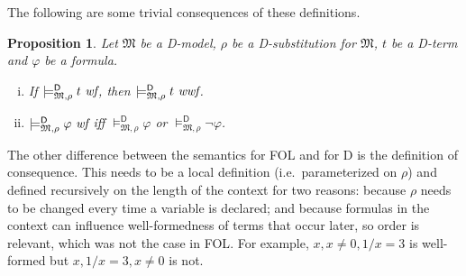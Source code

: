 \documentclass{article}
\newtheorem{proposition}[definition]{Proposition}
\newcommand{\D}{\textsf D}
\newcommand{\FOL}{\textsf{FOL}}
\newcommand{\wf}{\ \mbox{\em wf}}
\newcommand{\wwf}{\ \mbox{\em wwf}}
\newcommand{\mymodelss}[3]{\ensuremath{\models_{\mathfrak{#2},{#3}}^{\mathsf{#1}}}}
\begin{document}
The following are some trivial consequences of these definitions.
\begin{proposition}\label{modelDprops}
Let $\mathfrak M$ be a {\D}-model, $\rho$ be a {\D}-substitution for
$\mathfrak M$, $t$ be a {\D}-term and $\varphi$ be a formula.
\begin{enumerate}[(i)]
\item If $\mymodelss{D}M\rho t\wf$, then $\mymodelss{D}M\rho t\wwf$.
\item $\mymodelss{D}M\rho\varphi\wf$ iff $\mymodelss{D}M\rho\varphi$ or
$\mymodelss{D}M\rho\neg\varphi$.
\end{enumerate}
\end{proposition}

The other difference between the semantics for {\FOL} and for {\D} is
the definition of consequence.  This needs to be a local definition
(i.e.\ parameterized on $\rho$) and defined recursively on the length
of the context for two reasons: because $\rho$ needs to be changed every
time a variable is declared; and because formulas in the context can
influence well-formedness of terms that occur later, so order is
relevant, which was not the case in {\FOL}.  For example,
$x,x\neq 0,1/x=3$ is well-formed but $x,1/x=3,x\neq 0$ is not.
\end{document}
